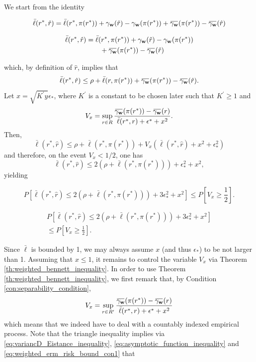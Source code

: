 \documentclass[letterpaper]{article} %
\def\DoubleColumn{}
\def\DoubleColumnEnd{}
\def\SingleColumn{}
\def\SingleColumnEnd{}
\newcommand{\Pro}{P}
\newcommand{\overbar}[1]{\mkern 1.5mu\overline{\mkern-1.5mu#1\mkern-1.5mu}\mkern 1.5mu}
\newcommand*\cen[1]{\overbar{#1}}
\newcommand{\weight}{\mathbf{w}}
\newcommand{\relossf}{\bar{\ell}}
\newcommand{\cenprocess}[1]{\cen{\gamma_{#1}}}
\begin{document}
    We start from the identity
    \SingleColumn
    \[\relossf(r^*,\hat{r})=\relossf(r^*,\pi(r^*))+\gamma_\weight(\hat{r})-\gamma_\weight(\pi(r^*))+\cenprocess{\weight}(\pi(r^*))-\cenprocess{\weight}(\hat{r})\]
    \SingleColumnEnd
    \DoubleColumn
    \begin{align*}
        \relossf(r^*,\hat{r})&=\relossf(r^*,\pi(r^*))+\gamma_\weight(\hat{r})-\gamma_\weight(\pi(r^*))\\
        &\qquad+\cenprocess{\weight}(\pi(r^*))-\cenprocess{\weight}(\hat{r})
    \end{align*}
    \DoubleColumnEnd
    which, by definition of $\hat{r}$, implies that
    \[\relossf(r^*,\hat{r})\le \rho+\relossf(r,\pi(r^*))+\cenprocess{\weight}(\pi(r^*))-\cenprocess{\weight}(\hat{r}).\]
    Let $x=\sqrt{K^\prime y}\epsilon_*$, where $K^\prime$ is a constant to be chosen later such that $K^\prime\ge 1$ and
    \[V_x=\sup_{r\in R}\frac{\cenprocess{\weight}(\pi(r^*))-\cenprocess{\weight}(r)}{\relossf(r^*,r)+\epsilon^*+x^2}.\]
    Then,
    \[\relossf(r^*,\hat{r})\le \rho+\relossf(r^*,\pi(r^*))+V_x(\relossf(r^*,\hat{r})+x^2+\epsilon_*^2)\]
    and therefore, on the event $V_x<1/2$, one has
    \[\relossf(r^*,\hat{r})\le 2(\rho+\relossf(r^*,\pi(r^*)))+\epsilon_*^2+x^2,\]
    yielding
    \SingleColumn
    \begin{equation}
        \label{eq:risk_bounds_convert}
        \Pro[\relossf(r^*,\hat{r})\le 2(\rho+\relossf(r^*,\pi(r^*)))+3\epsilon_*^2+x^2]\le \Pro[V_x\ge \frac{1}{2}].
    \end{equation}
    \SingleColumnEnd
    \DoubleColumn
    \begin{equation}
        \begin{aligned}
            \label{eq:risk_bounds_convert}
            \Pro[\relossf(r^*,\hat{r})\le 2(\rho+\relossf(r^*,\pi(r^*)))+3\epsilon_*^2+x^2]\\
            \le \Pro[V_x\ge \frac{1}{2}].
        \end{aligned}
    \end{equation}
    \DoubleColumnEnd
    Since $\relossf$ is bounded by 1, we may always assume $x$ (and thus $\epsilon_*$) to be not larger than 1. Assuming that $x\le 1$, it remains to control the variable $V_x$ via Theorem \ref{th:weighted_bennett_inequality}. In order to use Theorem \ref{th:weighted_bennett_inequality}, we first remark that, by Condition \ref{con:separability_condition},
    \[V_x=\sup_{r\in R^\prime}\frac{\cenprocess{\weight}(\pi(r^*))-\cenprocess{\weight}(r)}{\relossf(r^*,r)+\epsilon^*+x^2}\]
    which means that we indeed have to deal with a countably indexed empirical process. Note that the triangle inequality implies via \eqref{eq:variancD_Eistance_inequality}, \eqref{eq:asymptotic_function_inequality} and \eqref{eq:weighted_erm_risk_bound_con1} that
\end{document}
